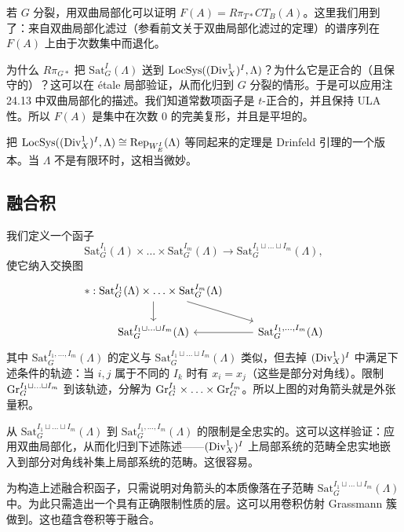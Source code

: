 \begin{remark}
若 $G$ 分裂，用双曲局部化可以证明 $F(A)=R\pi_{T*}CT_B(A)$。这里我们用到了：来自双曲局部化滤过（参看前文关于双曲局部化滤过的定理）的谱序列在 $F(A)$ 上由于次数集中而退化。
\end{remark}

为什么 $R\pi_{G*}$ 把 $\mathrm{Sat}^I_G(\Lambda)$ 送到 $\mathrm{LocSys}((\mathrm{Div}^1_X)^I,\Lambda)$？为什么它是正合的（且保守的）？这可以在 étale 局部验证，从而化归到 $G$ 分裂的情形。于是可以应用注 24.13 中双曲局部化的描述。我们知道常数项函子是 $t$-正合的，并且保持 ULA 性。所以 $F(A)$ 是集中在次数 $0$ 的完美复形，并且是平坦的。

\begin{remark}
把 $\mathrm{LocSys}((\mathrm{Div}^1_X)^I,\Lambda)\cong\operatorname{Rep}_{W^I_E}(\Lambda)$ 等同起来的定理是 Drinfeld 引理的一个版本。当 $\Lambda$ 不是有限环时，这相当微妙。
\end{remark}

\subsection{融合积}

我们定义一个函子
\[
\mathrm{Sat}^{I_1}_G(\Lambda)\times\ldots\times\mathrm{Sat}^{I_m}_G(\Lambda)\to\mathrm{Sat}^{I_1\sqcup\ldots\sqcup I_m}_G(\Lambda),
\]
使它纳入交换图
\[
\begin{tikzcd}
{*:\mathrm{Sat}^{I_1}_G(\Lambda)\times\ldots\times\mathrm{Sat}^{I_m}_G(\Lambda)} \arrow[d] \arrow[dr] \\
\mathrm{Sat}^{I_1\sqcup\ldots\sqcup I_m}_G(\Lambda) & \mathrm{Sat}^{I_1,\ldots,I_m}_G(\Lambda) \arrow[l]
\end{tikzcd}
\]
其中 $\mathrm{Sat}^{I_1,\ldots,I_m}_G(\Lambda)$ 的定义与 $\mathrm{Sat}^{I_1\sqcup\ldots\sqcup I_m}_G(\Lambda)$ 类似，但去掉 $(\mathrm{Div}^1_X)^I$ 中满足下述条件的轨迹：当 $i,j$ 属于不同的 $I_k$ 时有 $x_i=x_j$（这些是部分对角线）。限制 $\mathrm{Gr}_G^{I_1\sqcup\ldots\sqcup I_m}$ 到该轨迹，分解为 $\mathrm{Gr}_G^{I_1}\times\ldots\times\mathrm{Gr}_G^{I_m}$。所以上图的对角箭头就是外张量积。

从 $\mathrm{Sat}^{I_1\sqcup\ldots\sqcup I_m}_G(\Lambda)$ 到 $\mathrm{Sat}^{I_1,\ldots,I_m}_G(\Lambda)$ 的限制是全忠实的。这可以这样验证：应用双曲局部化，从而化归到下述陈述——$(\mathrm{Div}^1_X)^I$ 上局部系统的范畴全忠实地嵌入到部分对角线补集上局部系统的范畴。这很容易。

为构造上述融合积函子，只需说明对角箭头的本质像落在子范畴 $\mathrm{Sat}^{I_1\sqcup\ldots\sqcup I_m}_G(\Lambda)$ 中。为此只需造出一个具有正确限制性质的层。这可以用卷积仿射 Grassmann 簇做到。这也蕴含卷积等于融合。

